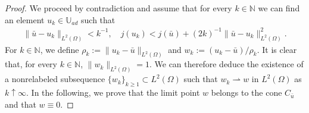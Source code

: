 \documentclass[final]{siamart0216}
\begin{document}
\begin{proof}
We proceed by contradiction and assume that for every $k\in\mathbb{N}$ we can find an element $u_k\in\mathbb{U}_{ad}$ such that
\begin{align}\label{eq:estimate_contradiction}
\|\bar{u}-u_k\|_{L^2(\Omega)}<k^{-1},
\quad
j(u_k)<j(\bar{u})+(2k)^{-1}\|\bar{u}-u_k\|_{L^2(\Omega)}^2.
\end{align}
For $k\in\mathbb{N}$, we define $\rho_k := \|u_k - \bar{u}\|_{L^2(\Omega)}$ and $w_k:=(u_k-\bar{u})/\rho_k$. It is clear that, for every $k\in\mathbb{N}$, $\|w_k\|_{L^2(\Omega)}=1$. We can therefore deduce the existence of a nonrelabeled subsequence $\{w_k\}_{k\geq 1}\subset L^2(\Omega)$ such that $w_k \rightharpoonup w$ in $L^2(\Omega)$ as $k \uparrow\infty$. In the following, we prove that the limit point $w$ belongs to the cone $C_{\bar{u}}$ and that $w\equiv 0$.


\end{proof}
\end{document}
